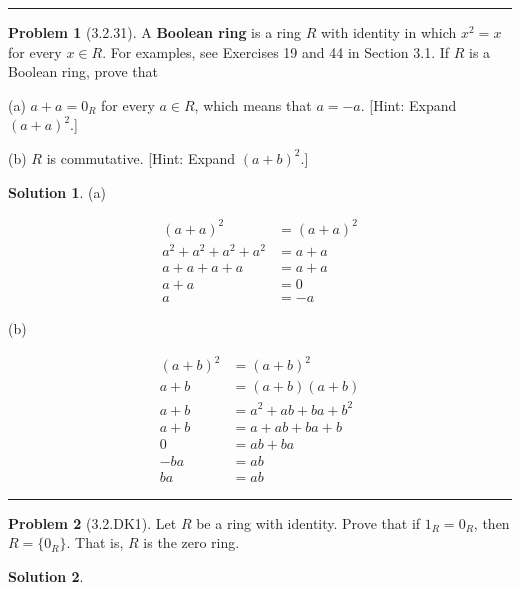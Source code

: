\documentclass[12pt]{article}
\theoremstyle{definition}
\newtheorem*{prob}{Problem}
\newtheorem*{soln}{Solution}
\newcommand{\hr}{\vspace*{\parskip}\hrule}
\begin{document}
\hr

%
%


\begin{prob}[3.2.31]
A \textbf{Boolean ring} is a ring $R$ with identity in which 
$x^2 = x$ for every $x\in R$. For examples, see Exercises 19 and 44 in Section 3.1. 
If $R$ is a Boolean ring, prove that      

(a)   $a + a = 0_R$ for every $a\in R$, which means that $a = -a$. 
[Hint: Expand $(a + a)^2$.]     

(b) $R$ is commutative. [Hint: Expand $(a + b)^2$.]
\end{prob}

\begin{soln}

(a)

\begin{align*}
(a+a)^2&=(a+a)^2\\
a^2+a^2+a^2+a^2&=a+a\\
a+a+a+a&=a+a\\
a+a&=0\\
a&=-a
\end{align*}

(b)

\begin{align*}
(a+b)^2&=(a+b)^2\\
a+b&= (a+b)(a+b)\\
a+b&=a^2+ab+ba+b^2\\
a+b&=a+ab+ba+b\\
0&=ab+ba\\
-ba&=ab\\
ba&=ab
\end{align*}

\end{soln}

\hr

\begin{prob}[3.2.DK1]
Let $R$ be a ring with identity. Prove that if $1_R=0_R$, then
$R = \{ 0_R \}$. That is, $R$ is the zero ring.
\end{prob}

\begin{soln}

\end{soln}
\end{document}
